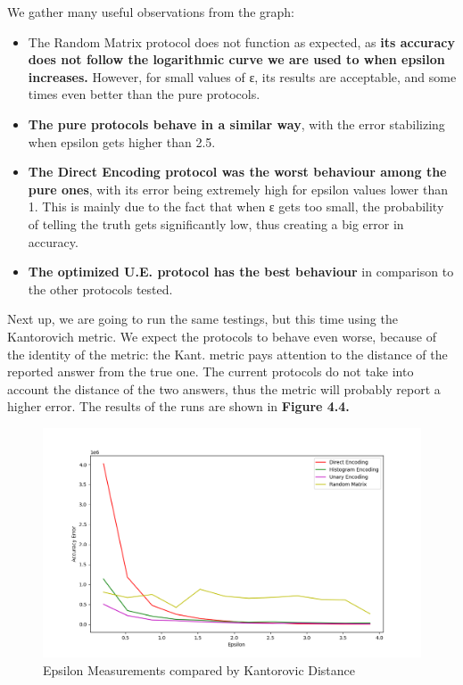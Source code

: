 We gather many useful observations from the graph:

\begin{itemize}
    \item The Random Matrix protocol does not function as expected, as \textbf{its accuracy does not follow the logarithmic curve we are used to when epsilon increases.} However, for small values of ε, its results are acceptable, and some times even better than the pure protocols.
    \item \textbf{The pure protocols behave in a similar way}, with the error stabilizing when epsilon gets higher than 2.5. 
    \item \textbf{The Direct Encoding protocol was the worst behaviour among the pure ones}, with its error being extremely high for epsilon values lower than 1.  This is mainly due to the fact that when ε gets too small, the probability of telling the truth gets significantly low, thus creating a big error in accuracy.
    \item \textbf{The optimized U.E. protocol has the best behaviour} in comparison to the other protocols tested.
\end{itemize}

Next up, we are going to run the same testings, but this time using the Kantorovich metric. We expect the protocols to behave even worse, because of the identity of the metric: the Kant. metric pays attention to the distance of the reported answer from the true one. The current protocols do not take into account the distance of the two answers, thus the metric will probably report a higher error. The results of the runs are shown in \textbf{Figure 4.4.}

\begin{figure}[!htb]\centering
    \includegraphics[width=1\textwidth]{images/epsilon_others_kant.png}
    \caption{Epsilon Measurements compared by Kantorovic Distance}
\end{figure}


